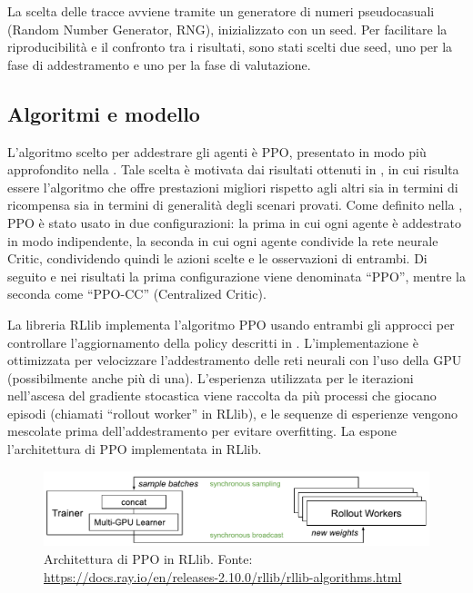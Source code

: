 La scelta delle tracce avviene tramite un generatore di numeri pseudocasuali (Random Number Generator, RNG), inizializzato con un seed. Per facilitare la riproducibilità e il confronto tra i risultati, sono stati scelti due seed, uno per la fase di addestramento e uno per la fase di valutazione.

\subsection{Algoritmi e modello}

L'algoritmo scelto per addestrare gli agenti è PPO, presentato in modo più approfondito nella . Tale scelta è motivata dai risultati ottenuti in \cite{Petriglia2024}, in cui risulta essere l'algoritmo che offre prestazioni migliori rispetto agli altri sia in termini di ricompensa sia in termini di generalità degli scenari provati. Come definito nella , PPO è stato usato in due configurazioni: la prima in cui ogni agente è addestrato in modo indipendente, la seconda in cui ogni agente condivide la rete neurale Critic, condividendo quindi le azioni scelte e le osservazioni di entrambi. Di seguito e nei risultati la prima configurazione viene denominata ``PPO'', mentre la seconda come ``PPO-CC'' (Centralized Critic).

La libreria RLlib implementa l'algoritmo PPO usando entrambi gli approcci per controllare l'aggiornamento della policy descritti in . L'implementazione è ottimizzata per velocizzare l'addestramento delle reti neurali con l'uso della GPU (possibilmente anche più di una). L'esperienza utilizzata per le iterazioni nell'ascesa del gradiente stocastica viene raccolta da più processi che giocano episodi (chiamati ``rollout worker'' in RLlib), e le sequenze di esperienze vengono mescolate prima dell'addestramento per evitare overfitting. La  espone l'architettura di PPO implementata in RLlib.

\begin{figure}
    \centering
    \includegraphics[width=\linewidth]{assets/5/ray_ppo_architecture.pdf}
    \caption[Architettura di PPO in RLlib]{Architettura di PPO in RLlib. Fonte: \url{https://docs.ray.io/en/releases-2.10.0/rllib/rllib-algorithms.html}}
    \label{fig:5_rllib_ppo_architecture}
\end{figure}

